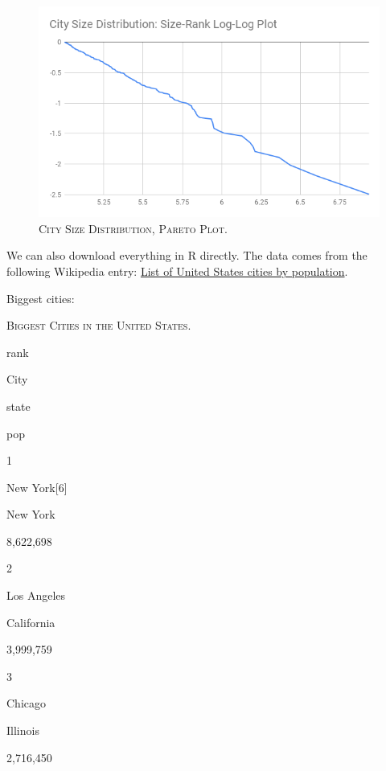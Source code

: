 \documentclass[]{book}
\theoremstyle{definition}
\theoremstyle{definition}
\theoremstyle{definition}
\theoremstyle{remark}
\begin{document}
\begin{figure}

{\centering \includegraphics[width=1\linewidth]{figures/city-size-wikipedia} 

}

\caption{\textsc{City Size Distribution, Pareto Plot}.}\label{fig:city-size-wikipedia}
\end{figure}

We can also download everything in R directly. The data comes from the
following Wikipedia entry:
\href{https://en.wikipedia.org/wiki/List_of_United_States_cities_by_population}{List
of United States cities by population}.

Biggest cities:









\label{tab:unnamed-chunk-7}\textsc{Biggest Cities in the United States.}

rank

City

state

pop

1

New York{[}6{]}

New York

8,622,698

2

Los Angeles

California

3,999,759

3

Chicago

Illinois

2,716,450
\end{document}
